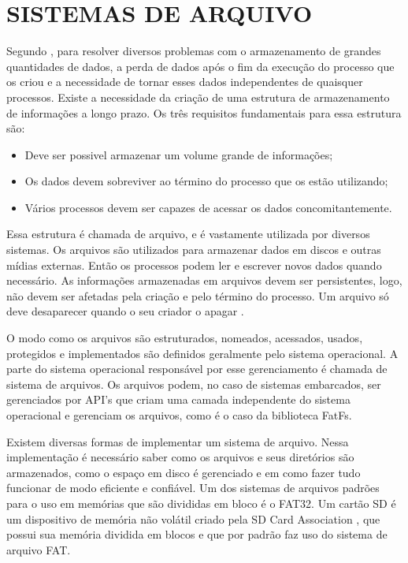 \section{SISTEMAS DE ARQUIVO}
Segundo , para resolver diversos problemas com o armazenamento de grandes quantidades de dados, a perda de dados após o fim da execução do processo que os criou e a necessidade de tornar esses dados independentes de quaisquer processos. Existe a necessidade da criação de uma estrutura de armazenamento de informações a longo prazo. Os três requisitos fundamentais para essa estrutura são:

\begin{itemize}
    \item Deve ser possivel armazenar um volume grande de informações;
    \item Os dados devem sobreviver ao término do processo que os estão utilizando;
    \item Vários processos devem ser capazes de acessar os dados concomitantemente.
\end{itemize}

Essa estrutura é chamada de arquivo, e é vastamente utilizada por diversos sistemas. Os arquivos são utilizados para armazenar dados em discos e outras mídias externas. Então os processos podem ler e escrever novos dados quando necessário. As informações armazenadas em arquivos devem ser persistentes, logo, não devem ser afetadas pela criação e pelo término do processo. Um arquivo só deve desaparecer quando o seu criador o apagar \cite{tanenbaumSO}.

O modo como os arquivos são estruturados, nomeados, acessados, usados, protegidos e implementados são definidos geralmente pelo sistema operacional. A parte do sistema operacional responsável por esse gerenciamento é chamada de sistema de arquivos. Os arquivos podem, no caso de sistemas embarcados, ser gerenciados por API's que criam uma camada independente do sistema operacional e gerenciam os arquivos, como é o caso da biblioteca FatFs. 

Existem diversas formas de implementar um sistema de arquivo. Nessa implementação é necessário saber como os arquivos e seus diretórios são armazenados, como o espaço em disco é gerenciado e em como fazer tudo funcionar de modo eficiente e confiável. 
Um dos sistemas de arquivos padrões para o uso em memórias que são divididas em bloco é o FAT32. 
Um cartão SD é um dispositivo de memória não volátil criado pela SD Card Association \cite{SDCARD}, que possui sua memória dividida em blocos e que por padrão faz uso do sistema de arquivo FAT.




